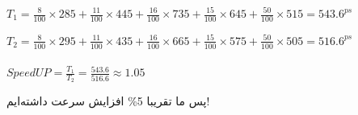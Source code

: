 \setLTR

$T_1 = \frac{8}{100} \times 285 + \frac{11}{100} \times 445 +\frac{16}{100} \times 735 + \frac{15}{100} \times 645 +\frac{50}{100} \times 515  = 543.6^{ps}$

$T_2 = \frac{8}{100} \times 295 + \frac{11}{100} \times 435 +\frac{16}{100} \times 665 + \frac{15}{100} \times 575 +\frac{50}{100} \times 505  = 516.6^{ps}$ \\ \\



$SpeedUP = \frac{T_1}{T_2} = \frac{543.6}{516.6} \approx 1.05$
\setRTL

پس ما تقریبا 5\% افزایش سرعت داشته‌ایم!